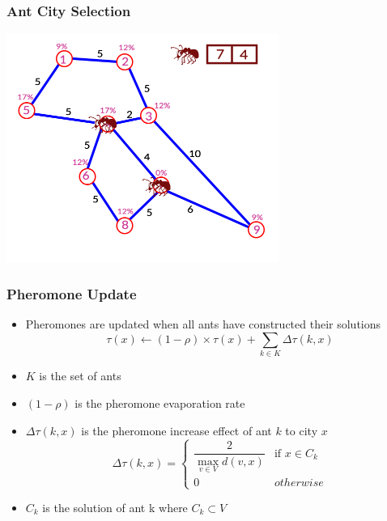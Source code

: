 \documentclass[12pt]{beamer}
\begin{document}
\begin{frame}
\frametitle{Ant City Selection}
\begin{center}
\includegraphics[height=75mm]{Images/antred4}\\
\end{center}
\end{frame}


\begin{frame}
\frametitle{Pheromone Update}
\begin{itemize}
\item Pheromones are updated when all ants have constructed their solutions
$$
\tau(x) \leftarrow (1 - \rho) \times \tau(x) + \sum\limits_{k \in K} \Delta\tau(k,x)
$$
\item $K$ is the set of ants
\item $(1-\rho)$ is the pheromone evaporation rate
\item $\Delta\tau(k,x)$ is the pheromone increase effect of ant $k$ to city $x$ 
$$\Delta\tau(k,x) = 
\begin{cases}
\dfrac{2}{\max_{v \in V}d(v,x)}	& \text{if } x \in C_{k}\\ 
0								& otherwise
\end{cases}
$$
\item $C_{k}$ is the solution of ant k where $C_{k} \subset V$
\end{itemize}
\end{frame}
\end{document}
